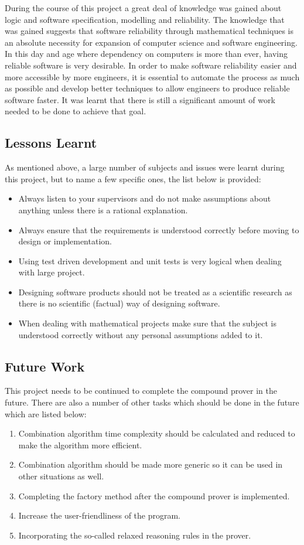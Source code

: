 \documentclass[10pt, a4paper, titlepage]{article}
\begin{document}
During the course of this project a great deal of knowledge was gained about logic and software specification, modelling and reliability. The knowledge that was gained suggests that software reliability through mathematical techniques is an absolute necessity for expansion of computer science and software engineering. In this day and age where dependency on computers is more than ever, having reliable software is very desirable. In order to make software reliability easier and more accessible by more engineers, it is essential to automate the process as much as possible and develop better techniques to allow engineers to produce reliable software faster. It was learnt that there is still a significant amount of work needed to be done to achieve that goal.

\subsection{Lessons Learnt}
As mentioned above, a large number of subjects and issues were learnt during this project, but to name a few specific ones, the list below is provided:
 
\begin{itemize}
\item Always listen to your supervisors and do not make assumptions about anything unless there is a rational explanation. 
\item Always ensure that the requirements is understood correctly before moving to design or implementation.
\item Using test driven development and unit tests is very logical when dealing with large project.
\item Designing software products should not be treated as a scientific research as there is no scientific (factual) way of designing software.
\item When dealing with mathematical projects make sure that the subject is understood correctly without any personal assumptions added to it.
\end{itemize}

\subsection{Future Work}
This project needs to be continued to complete the compound prover in the future. There are also a number of other tasks which should be done in the future which are listed below:

\begin{enumerate}
\item Combination algorithm time complexity should be calculated and reduced to make the algorithm more efficient.
\item Combination algorithm should be made more generic so it can be used in other situations as well.
\item Completing the factory method after the compound prover is implemented.
\item Increase the user-friendliness of the program.
\item Incorporating the so-called relaxed reasoning rules in the prover.
\end{enumerate}
\end{document}
